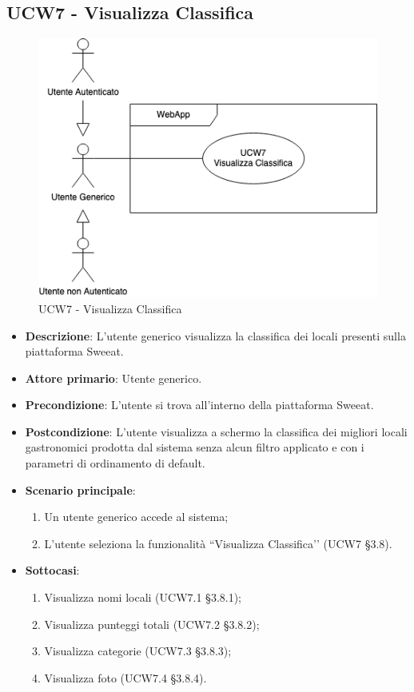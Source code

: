 \subsection{UCW7 - Visualizza Classifica}
\begin{figure}[!h]
\centering
\includegraphics[scale=0.5]{UC_images/UCW7.png}
\caption{UCW7 - Visualizza Classifica}
\end{figure}
\begin{center}
\end{center}
\begin{itemize}
	\item \textbf{Descrizione}: L'utente generico visualizza la classifica dei locali presenti sulla piattaforma Sweeat.
    \item \textbf{Attore primario}: Utente generico.
    \item \textbf{Precondizione}: L’utente si trova all’interno della piattaforma Sweeat.
    \item \textbf{Postcondizione}: L’utente visualizza a schermo la classifica dei migliori locali gastronomici prodotta dal sistema senza alcun filtro applicato e con i parametri di ordinamento di default.
    \item \textbf{Scenario principale}: 
    \begin{enumerate}
        \item Un utente generico accede al sistema;
        \item L’utente seleziona la funzionalità “Visualizza Classifica’’ (UCW7 \S{}3.8).
    \end{enumerate}
    \item \textbf{Sottocasi}:
    \begin{enumerate}
        \item Visualizza nomi locali (UCW7.1 §3.8.1);
        \item Visualizza punteggi totali (UCW7.2 §3.8.2);
        \item Visualizza categorie (UCW7.3 §3.8.3);
        \item Visualizza foto (UCW7.4 §3.8.4).
    \end{enumerate}
\end{itemize}

